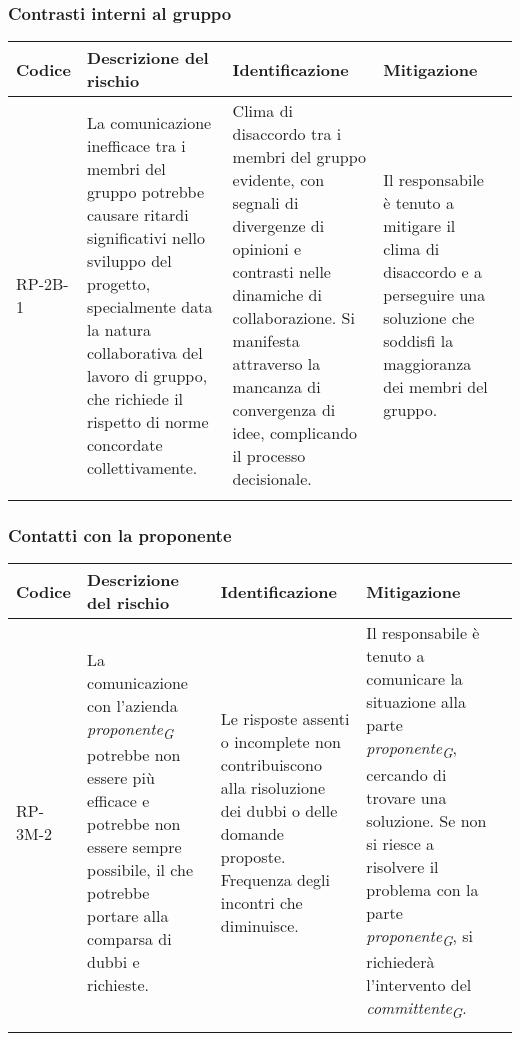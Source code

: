 \subsubsection{Contrasti interni al gruppo}
\begin{table}[H]
    \centering
    \begin{tabularx}{\textwidth}{l>{\RaggedRight}X>{\RaggedRight}X>{\RaggedRight}X>{\RaggedRight}X}
    \toprule
    \rowcolor{gray!50}
    \textbf{Codice} & \textbf{Descrizione del rischio} & \textbf{Identificazione} & \textbf{Mitigazione} \\
    \midrule
    \addlinespace 
    RP-2B-1 & 
    La comunicazione inefficace tra i membri del gruppo potrebbe causare ritardi significativi nello sviluppo del progetto, specialmente data la natura collaborativa del lavoro di gruppo, che richiede il rispetto di norme concordate collettivamente.& 
    Clima di disaccordo tra i membri del gruppo evidente, con segnali di divergenze di opinioni e contrasti nelle dinamiche di collaborazione. Si manifesta attraverso la mancanza di convergenza di idee, complicando il processo decisionale. &
    Il responsabile è tenuto a mitigare il clima di disaccordo e a perseguire una soluzione che soddisfi la maggioranza dei membri del gruppo.\\
    \bottomrule
    \addlinespace 
    \end{tabularx}
\end{table}

\vspace{2cm}

\subsubsection{Contatti con la proponente}
\begin{table}[H]
    \centering
    \begin{tabularx}{\textwidth}{l>{\RaggedRight}X>{\RaggedRight}X>{\RaggedRight}X>{\RaggedRight}X}
    \toprule
    \rowcolor{gray!50}
    \textbf{Codice} & \textbf{Descrizione del rischio} & \textbf{Identificazione} & \textbf{Mitigazione} \\
    \midrule
    \addlinespace 
    RP-3M-2 & 
    La comunicazione con l'azienda \textit{proponente}\textsubscript{\textit{G}} potrebbe non essere più efficace e potrebbe non essere sempre possibile, il che potrebbe portare alla comparsa di dubbi e richieste. & 
    Le risposte assenti o incomplete non contribuiscono alla risoluzione dei dubbi o delle domande proposte. Frequenza degli incontri che diminuisce. &
    Il responsabile è tenuto a comunicare la situazione alla parte \textit{proponente}\textsubscript{\textit{G}}, cercando di trovare una soluzione. Se non si riesce a risolvere il problema con la parte \textit{proponente}\textsubscript{\textit{G}}, si richiederà l’intervento del \textit{committente}\textsubscript{\textit{G}}. \\
    \bottomrule
    \addlinespace 
    \end{tabularx}
\end{table}

\pagebreak